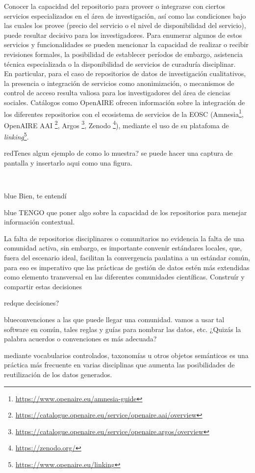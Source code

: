 \documentclass[runningheads]{llncs}
\def \bchregi {\begin{color}{red}}
\def \echregi {\end{color}}
\def \bchgon {\begin{color}{blue}}
\def \echgon {\end{color}}
\begin{document}
Conocer la capacidad del repositorio para proveer o integrarse con ciertos servicios especializados en el área de investigación, así como las condiciones bajo las cuales los provee (precio del servicio o el nivel de disponibilidad del servicio), puede resultar decisivo para los investigadores.  
Para enumerar algunos de estos servicios y funcionalidades se pueden mencionar la capacidad de realizar o recibir revisiones formales, la posibilidad de establecer períodos de embargo, asistencia técnica especializada o la disponibilidad de servicios de curaduría disciplinar.\\
En particular, para el caso de repositorios de datos de investigación cualitativos, la presencia o integración de servicios como anonimización, o mecanismos de control de acceso resulta valiosa para los investigadores del área de ciencias sociales. 
Catálogos como OpenAIRE ofrecen información sobre la integración de los diferentes repositorios con el ecosistema de servicios de la EOSC (Amnesia\footnote{\url{https://www.openaire.eu/amnesia-guide}}, OpenAIRE AAI \footnote{\url{https://catalogue.openaire.eu/service/openaire.aai/overview}}, Argos \footnote{\url{https://catalogue.openaire.eu/service/openaire.argos/overview}}, Zenodo \footnote{\url{https://zenodo.org/}}), mediante el uso de su platafoma de \textit{linking}\footnote{\url{https://www.openaire.eu/linking}}.\\
\bchregi Tenes algun ejemplo de como lo muestra? se puede hacer una captura de pantalla y insertarlo aqui como una figura.
\echregi \\
\bchgon
Bien, te entendí
\echgon

\bchgon
TENGO que poner algo sobre la capacidad de los repositorios para menejar información contextual.
\echgon

La falta de repositorios disciplinares o comunitarios no evidencia la falta de una comunidad activa, sin embargo, es importante convenir estándares locales, que, fuera del escenario ideal, facilitan la convergencia paulatina a un estándar común, para eso es imperativo que las prácticas de gestión de datos estén más extendidas como elemento transversal en las diferentes comunidades científicas. Construír y compartir estas decisiones
\bchregi que decisiones? \echregi
\bchgon convenciones a las que puede llegar una comunidad. vamos a usar tal software en común, tales reglas y guías para nombrar las datos, etc. ¿Quizás la palabra acuerdos o convenciones es más adecuada? \echgon
mediante vocabularios controlados, taxonomías u otros objetos semánticos es una práctica más frecuente en varias disciplinas que aumenta las posibilidades de reutilización de los datos generados.\\
\end{document}
